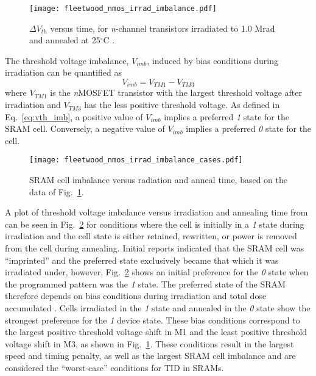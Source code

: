 \begin{figure}[tb]
    \begin{center}
        \texttt{[image: fleetwood\_nmos\_irrad\_imbalance.pdf]}
    \end{center}
    \caption[$\Delta V_{th}$ versus time, for \emph{n}-channel transistors irradiated to 1.0 Mrad and annealed at 25$^\circ$C.]{$\Delta V_{th}$ versus time, for \emph{n}-channel transistors irradiated to 1.0 Mrad and annealed at 25$^\circ$C \cite{Fleetwood:1987cfa}.}
    \label{fig:sram_cell_imb_nmos_vth}
\end{figure}

The threshold voltage imbalance, $V_{imb}$, induced by bias conditions during irradiation can be quantified as
\begin{equation}
    \label{eq:vth_imb}
    V_{imb} = V_{TM1} - V_{TM3}
\end{equation}
where $V_{TM1}$ is the \emph{n}MOSFET transistor with the largest threshold voltage after irradiation and $V_{TM3}$ has the less positive threshold voltage.
As defined in Eq.~\ref{eq:vth_imb}, a positive value of $V_{imb}$ implies a preferred \emph{1} state for the SRAM cell.
Conversely, a negative value of $V_{imb}$ implies a preferred \emph{0} state for the cell.

\begin{figure}[tb]
    \begin{center}
        \texttt{[image: fleetwood\_nmos\_irrad\_imbalance\_cases.pdf]}
    \end{center}
    \caption{SRAM cell imbalance versus radiation and anneal time, based on the data of Fig.~\ref{fig:sram_cell_imb_nmos_vth}.}
    \label{fig:sram_cell_imb}
\end{figure}

A plot of threshold voltage imbalance versus irradiation and annealing time from \cite{Fleetwood:1987cfa} can be seen in Fig.~\ref{fig:sram_cell_imb} for conditions where the cell is initially in a \emph{1} state during irradiation and the cell state is either retained, rewritten, or power is removed from the cell during annealing.
Initial reports indicated that the SRAM cell was ``imprinted'' and the preferred state exclusively became that which it was irradiated under, however, Fig.~\ref{fig:sram_cell_imb} shows an initial preference for the \emph{0} state when the programmed pattern was the \emph{1} state. 
The preferred state of the SRAM therefore depends on bias conditions during irradiation and total dose accumulated \cite{Fleetwood:1987cfa}.
Cells irradiated in the \emph{1} state and annealed in the \emph{0} state show the strongest preference for the \emph{1} device state.
These bias conditions correspond to the largest positive threshold voltage shift in M1 and the least positive threshold voltage shift in M3, as shown in Fig.~\ref{fig:sram_cell_imb_nmos_vth}.
These conditions result in the largest speed and timing penalty, as well as the largest SRAM cell imbalance and are considered the ``worst-case'' conditions for TID in SRAMs.

